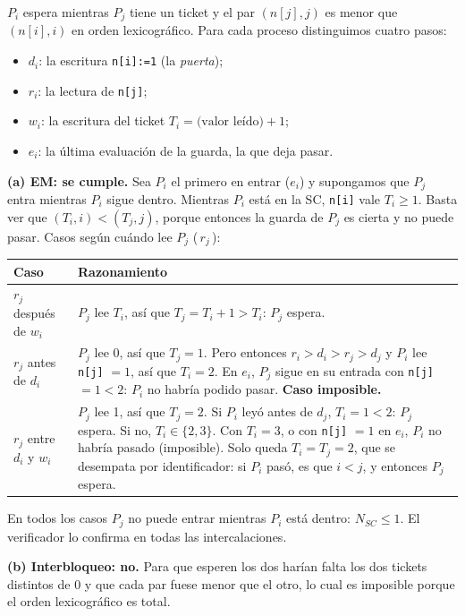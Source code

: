 \documentclass[11pt,a4paper,oneside]{report}
\begin{document}
\begin{solucion}
$P_i$ espera mientras $P_j$ tiene un ticket y el par $(n[j], j)$ es menor que $(n[i], i)$ en orden lexicográfico.
Para cada proceso distinguimos cuatro pasos:
\begin{itemize}[leftmargin=*,noitemsep]
  \item $d_i$: la escritura \texttt{n[i]:=1} (la \emph{puerta});
  \item $r_i$: la lectura de \texttt{n[j]};
  \item $w_i$: la escritura del ticket $T_i = \text{(valor leído)} + 1$;
  \item $e_i$: la última evaluación de la guarda, la que deja pasar.
\end{itemize}

\textbf{(a) EM: se cumple.} Sea $P_i$ el primero en entrar ($e_i$) y supongamos que $P_j$ entra mientras $P_i$
sigue dentro. Mientras $P_i$ está en la SC, \texttt{n[i]} vale $T_i \ge 1$. Basta ver que $(T_i, i) < (T_j, j)$,
porque entonces la guarda de $P_j$ es cierta y no puede pasar. Casos según cuándo lee $P_j$ (\,$r_j$\,):
\begin{center}\small
\begin{tabular}{p{3.6cm}p{10.2cm}}
\toprule
\textbf{Caso} & \textbf{Razonamiento} \\ \midrule
$r_j$ después de $w_i$ & $P_j$ lee $T_i$, así que $T_j = T_i + 1 > T_i$: $P_j$ espera. \\
$r_j$ antes de $d_i$ & $P_j$ lee 0, así que $T_j = 1$. Pero entonces $r_i > d_i > r_j > d_j$ y $P_i$ lee
\texttt{n[j]} $= 1$, así que $T_i = 2$. En $e_i$, $P_j$ sigue en su entrada con \texttt{n[j]} $= 1 < 2$: $P_i$ no
habría podido pasar. \textbf{Caso imposible.} \\
$r_j$ entre $d_i$ y $w_i$ & $P_j$ lee 1, así que $T_j = 2$. Si $P_i$ leyó antes de $d_j$, $T_i = 1 < 2$: $P_j$
espera. Si no, $T_i \in \{2, 3\}$. Con $T_i = 3$, o con \texttt{n[j]} $= 1$ en $e_i$, $P_i$ no habría pasado
(imposible). Solo queda $T_i = T_j = 2$, que se desempata por identificador: si $P_i$ pasó, es que $i < j$, y
entonces $P_j$ espera. \\
\bottomrule
\end{tabular}
\end{center}
En todos los casos $P_j$ no puede entrar mientras $P_i$ está dentro: $N_{SC} \le 1$. El verificador lo confirma en
todas las intercalaciones.

\textbf{(b) Interbloqueo: no.} Para que esperen los dos harían falta los dos tickets distintos de 0 y que cada par
fuese menor que el otro, lo cual es imposible porque el orden lexicográfico es total.


\end{solucion}
\end{document}
